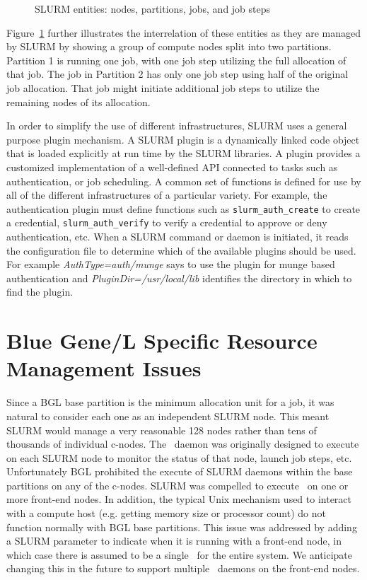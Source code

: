 \documentclass[10pt,onecolumn,times]{../common/llncs}
\begin{document}
{\begin{figure}[tcb]
\centerline{}
\caption{\small SLURM entities: nodes, partitions, jobs, and job steps}
\label{entities}
\end{figure}

Figure~\ref{entities} further illustrates the interrelation of these
entities as they are managed by SLURM by showing a group of
compute nodes split into two partitions. Partition 1 is running one job,
with one job step utilizing the full allocation of that job.  The job
in Partition 2 has only one job step using half of the original job
allocation.  That job might initiate additional job steps to utilize
the remaining nodes of its allocation.

In order to simplify the use of different infrastructures,
SLURM uses a general purpose plugin mechanism.  A SLURM plugin is a
dynamically linked code object that is loaded explicitly at run time
by the SLURM libraries.  A plugin provides a customized implementation
of a well-defined API connected to tasks such as authentication,
or job scheduling.  A common set of functions is defined
for use by all of the different infrastructures of a particular variety.
For example, the authentication plugin must define functions such as 
{\tt slurm\_auth\_create} to create a credential, {\tt slurm\_auth\_verify}
to verify a credential to approve or deny authentication, etc.  
When a SLURM command or daemon is initiated, it
reads the configuration file to determine which of the available plugins
should be used.  For example {\em AuthType=auth/munge} says to use the
plugin for munge based authentication and {\em PluginDir=/usr/local/lib}
identifies the directory in which to find the plugin.

\section {Blue Gene/L Specific Resource Management Issues}

Since a BGL base partition is the minimum allocation unit for a job, 
it was natural to consider each one as an independent SLURM node. 
This meant SLURM would manage a very reasonable 128 nodes 
rather than tens of thousands of individual c-nodes.
The \slurmd\ daemon was originally designed to execute on each 
SLURM node to monitor the status of that node, launch job steps, etc. 
Unfortunately BGL prohibited the execute of SLURM daemons within 
the base partitions on any of the c-nodes. 
SLURM was compelled to execute \slurmd\ on one or more 
front-end nodes.
In addition,  the typical Unix mechanism used to interact with a 
compute host (e.g. getting memory size or processor count) do not 
function normally with BGL base partitions. 
This issue was addressed by adding a SLURM parameter to 
indicate when it is running with a front-end node, in which case 
there is assumed to be a single \slurmd\ for the entire system. 
We anticipate changing this in the future to support multiple 
\slurmd\ daemons on the front-end nodes.

}
\end{document}
